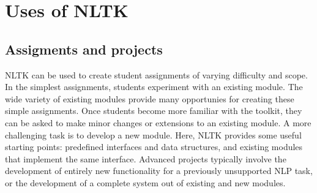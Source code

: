 \documentclass[11pt]{article}
\begin{document}
%
%
%

\section{Uses of NLTK}

\subsection{Assigments and projects}

NLTK can be used to create student assignments of varying difficulty
and scope.  
In the simplest assignments, students experiment with an existing
module.  The wide variety of existing modules provide many opportunies
for creating these simple assignments.
Once students become more familiar with the toolkit, they can be asked
to make minor changes or extensions to an existing module.
A more challenging task is to develop a new module.  Here, NLTK
provides some useful starting points: predefined interfaces and data
structures, and existing modules that implement the same interface.
Advanced projects typically involve the development of entirely new
functionality for a previously unsupported NLP task, or the
development of a complete system out of existing and new modules.
\end{document}
